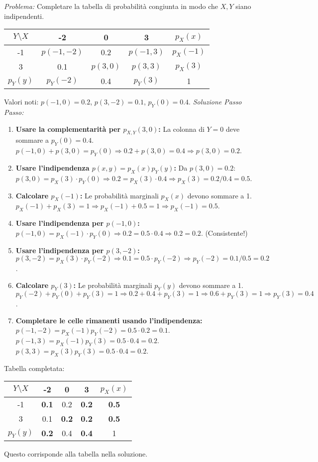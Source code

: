 \begin{example}
\textit{Problema:} Completare la tabella di probabilità congiunta in modo che $X, Y$ siano indipendenti.
\begin{center}
\begin{tabular}{c|ccc|c}
$Y \setminus X$ & -2 & 0 & 3 & $p_X(x)$ \\ \hline
-1 & $p(-1,-2)$ & 0.2 & $p(-1,3)$ & $p_X(-1)$ \\
3 & 0.1 & $p(3,0)$ & $p(3,3)$ & $p_X(3)$ \\ \hline
$p_Y(y)$ & $p_Y(-2)$ & 0.4 & $p_Y(3)$ & 1
\end{tabular}
\end{center}
Valori noti: $p(-1,0)=0.2$, $p(3,-2)=0.1$, $p_Y(0)=0.4$.
\textit{Soluzione Passo Passo:}
\begin{enumerate}
    \item \textbf{Usare la complementarità per $p_{X,Y}(3,0)$:}
    La colonna di $Y=0$ deve sommare a $p_Y(0)=0.4$.
    $p(-1,0) + p(3,0) = p_Y(0) \Rightarrow 0.2 + p(3,0) = 0.4 \Rightarrow p(3,0) = 0.2$.
    \item \textbf{Usare l'indipendenza $p(x,y) = p_X(x)p_Y(y)$:}
    Da $p(3,0) = 0.2$: $p(3,0) = p_X(3) \cdot p_Y(0) \Rightarrow 0.2 = p_X(3) \cdot 0.4 \Rightarrow p_X(3) = 0.2/0.4 = 0.5$.
    \item \textbf{Calcolare $p_X(-1)$:}
    Le probabilità marginali $p_X(x)$ devono sommare a 1.
    $p_X(-1) + p_X(3) = 1 \Rightarrow p_X(-1) + 0.5 = 1 \Rightarrow p_X(-1) = 0.5$.
    \item \textbf{Usare l'indipendenza per $p(-1,0)$:}
    $p(-1,0) = p_X(-1) \cdot p_Y(0) \Rightarrow 0.2 = 0.5 \cdot 0.4 \Rightarrow 0.2 = 0.2$. (Consistente!)
    \item \textbf{Usare l'indipendenza per $p(3,-2)$:}
    $p(3,-2) = p_X(3) \cdot p_Y(-2) \Rightarrow 0.1 = 0.5 \cdot p_Y(-2) \Rightarrow p_Y(-2) = 0.1/0.5 = 0.2$.
    \item \textbf{Calcolare $p_Y(3)$:}
    Le probabilità marginali $p_Y(y)$ devono sommare a 1.
    $p_Y(-2) + p_Y(0) + p_Y(3) = 1 \Rightarrow 0.2 + 0.4 + p_Y(3) = 1 \Rightarrow 0.6 + p_Y(3) = 1 \Rightarrow p_Y(3) = 0.4$.
    \item \textbf{Completare le celle rimanenti usando l'indipendenza:}
    $p(-1,-2) = p_X(-1)p_Y(-2) = 0.5 \cdot 0.2 = 0.1$.
    $p(-1,3) = p_X(-1)p_Y(3) = 0.5 \cdot 0.4 = 0.2$.
    $p(3,3) = p_X(3)p_Y(3) = 0.5 \cdot 0.4 = 0.2$.
\end{enumerate}
Tabella completata:
\begin{center}
\begin{tabular}{c|ccc|c}
$Y \setminus X$ & -2 & 0 & 3 & $p_X(x)$ \\ \hline
-1 & \textbf{0.1} & 0.2 & \textbf{0.2} & \textbf{0.5} \\
3 & 0.1 & \textbf{0.2} & \textbf{0.2} & \textbf{0.5} \\ \hline
$p_Y(y)$ & \textbf{0.2} & 0.4 & \textbf{0.4} & 1
\end{tabular}
\end{center}
Questo corrisponde alla tabella nella soluzione.
\end{example}

